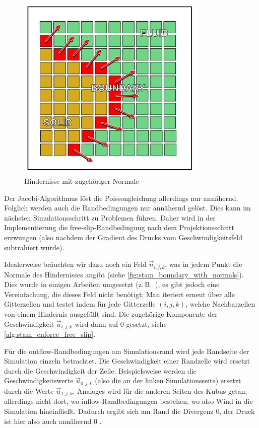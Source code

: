 \begin{figure}[ht]
\centering
\includegraphics[width=9cm]{images/boundary_with_normals}
\caption{Hindernisse mit zugehöriger Normale}
\label{fig:stam_boundary_with_normals}
\end{figure}

Der Jacobi-Algorithmus löst die Poissongleichung allerdings nur annähernd.
Folglich werden auch die Randbedingungen nur annähernd gelöst. Dies kann im
nächsten Simulationsschritt zu Problemen führen. Daher wird in der
Implementierung die free-slip-Randbedingung nach dem Projektionsschritt
erzwungen (also nachdem der Gradient des Drucks vom Geschwindigkeitsfeld
subtrahiert wurde).

Idealerweise bräuchten wir dazu noch ein Feld $\vec{n}_{i,j,k}$, was in jedem
Punkt die Normale des Hindernisses angibt (siehe
\autoref{fig:stam_boundary_with_normals}). Dies wurde in einigen
Arbeiten umgesetzt (z.\,B.\ \cite{Bordignon}), es gibt jedoch eine Vereinfachung,
die dieses Feld nicht benötigt: Man iteriert erneut über alle
Gitterzellen und testet indem für jede Gitterzelle $(i,j,k)$, welche
Nachbarzellen von einem Hindernis ausgefüllt sind. Die zugehörige
Komponente der Geschwindigkeit $\vec{u}_{i,j,k}$ wird dann auf 0
gesetzt, siehe \autoref{alg:stam_enforce_free_slip}.

Für die outflow-Randbedingungen am Simulationsrand wird jede Randseite der
Simulation einzeln betrachtet. Die Geschwindigkeit einer Randzelle wird ersetzt
durch die Geschwindigkeit der  Zelle.
Beispielsweise werden die Geschwindigkeitswerte $\vec{u}_{0,j,k}$ (also die an
der linken Simulationsseite) ersetzt durch die Werte $\vec{u}_{1,j,k}$. Analoges
wird für die anderen Seiten des Kubus getan, allerdings nicht dort, wo
inflow-Randbedingungen bestehen, wo also Wind in die Simulation hineinfließt.
Dadurch ergibt sich am Rand die Divergenz 0, der Druck ist hier also auch
annähernd 0 .

